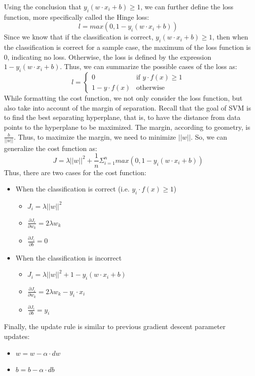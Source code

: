 \documentclass[12pt]{article}
\begin{document}
Using the conclusion that $y_i(w\cdot x_i + b) \geq 1$, we can further define the loss function, more specifically called the Hinge loss:
$$l = max(0, 1 - y_i(w\cdot x_i + b))$$
Since we know that if the classification is correct, $y_i(w\cdot x_i + b) \geq 1$, then when the classification is correct for a sample case, the maximum of the loss function is 0, indicating no loss. Otherwise, the loss is defined by the expression $1 - y_i(w\cdot x_i + b)$. Thus, we can summarize the possible cases of the loss as:
$$l =
\begin{cases}
0 & \text{if } y\cdot f(x) \geq 1\\
1 - y\cdot f(x) & \text{otherwise}
\end{cases}$$
While formatting the cost function, we not only consider the loss function, but also take into account of the margin of separation. Recall that the goal of SVM is to find the best separating hyperplane, that is, to have the distance from data points to the hyperplane to be maximized. The margin, according to geometry, is $\frac{b}{||w||}$. Thus, to maximize the margin, we need to minimize $||w||$. So, we can generalize the cost function as:
$$J = \lambda ||w||^2 + \frac{1}{n}\Sigma_{i=1}^{n}max(0, 1 - y_i(w\cdot x_i + b))$$
Thus, there are two cases for the cost function:
\begin{itemize}
\item When the classification is correct (i.e. $y_i\cdot f(x) \geq 1$)
\begin{itemize}
	\item $J_i = \lambda ||w||^2$
	\item $\frac{\partial J_i}{\partial w_k} = 2\lambda w_k$
	\item $\frac{\partial J_i}{\partial b} = 0$
\end{itemize}
\item When the classification is incorrect
\begin{itemize}
	\item $J_i = \lambda ||w||^2 + 1 - y_i(w\cdot x_i + b)$
	\item $\frac{\partial J_i}{\partial w_k} = 2\lambda w_k - y_i \cdot x_i$
	\item $\frac{\partial J_i}{\partial b} = y_i$
\end{itemize}
\end{itemize}

Finally, the update rule is similar to previous gradient descent parameter updates:
\begin{itemize}
	\item $w = w - \alpha\cdot dw$
	\item $b = b - \alpha\cdot db$
\end{itemize}
\newpage
\end{document}
